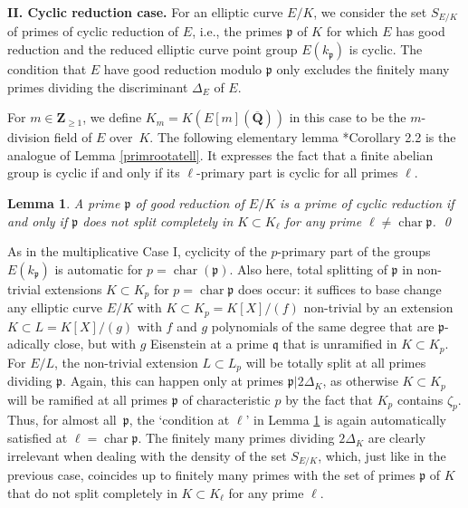\documentclass{amsart}
\theoremstyle{plain}
\newtheorem{lemma}[theorem]{Lemma}
\theoremstyle{definition}
\DeclareMathOperator{\characteristic}{char}
\newcommand{\Que}{{\mathbf{Q}}}
\newcommand{\Zee}{{\mathbf{Z}}}
\newcommand{\gothp}{{\mathfrak{p}}}
\newcommand{\gothq}{{\mathfrak{q}}}
\begin{document}
\medskip\noindent
{\bf II. Cyclic reduction case.}
For an elliptic curve $E/K$, we consider the set $S_{E/K}$ of 
primes of cyclic reduction of $E$, i.e.,
the primes $\gothp$ of $K$
for which $E$ has good reduction and the reduced elliptic
curve point group $E(k_\gothp)$ is cyclic.
The condition that $E$ have good reduction modulo $\gothp$ 
only excludes the finitely many primes dividing the
discriminant $\Delta_E$ of $E$.
 
For $m\in\Zee_{\ge1}$, we define $K_m=K(E[m](\overline \Que))$ 
in this case to be the $m$-division field of $E$ over~$K$.
The following elementary lemma \cite{Campagna-Stevenhagen}*{Corollary 2.2} 
is the analogue of Lemma \ref{primrootatell}. 
It expresses the fact that a finite abelian group is cyclic if and only if 
its $\ell$-primary part is cyclic for all primes $\ell$.

\begin{lemma}
\label{cyclicreductionatell}
A prime $\gothp$ of good reduction of $E/K$
is a prime of cyclic reduction
if and only if $\gothp$ does not split completely in 
$K\subset K_\ell$ for any prime 
$\ell\ne\characteristic{\gothp}$.
\qed
\end{lemma}
\noindent
As in the multiplicative Case I, cyclicity of the $p$-primary part of the groups $E(k_\gothp)$
is automatic for $p=\characteristic (\gothp)$.
Also here, total splitting of $\gothp$ in non-trivial extensions $K\subset K_p$ for 
$p=\characteristic{\gothp}$ does occur: it suffices to base change any elliptic curve $E/K$ with 
$K\subset K_p=K[X]/(f)$ non-trivial by an extension $K\subset L= K[X]/(g)$ with 
$f$ and $g$ polynomials of the same degree that are $\gothp$-adically close, 
but with $g$ Eisenstein at a prime $\gothq$ that is unramified in $K\subset K_p$.
For $E/L$, the non-trivial extension $L\subset L_p$ will be totally split at all primes dividing $\gothp$.
Again, this can happen only at primes $\gothp|2\Delta_K$, as otherwise $K\subset K_p$ will be
ramified at all primes $\gothp$ of characteristic $p$ by the fact that $K_p$ contains $\zeta_p$.
Thus, for almost all~$\gothp$,
the `condition at $\ell$' in Lemma \ref{cyclicreductionatell} is again 
automatically satisfied at $\ell=\characteristic{\gothp}$.
The finitely many primes dividing $2\Delta_K$ are clearly irrelevant when dealing with the density of the set $S_{E/K}$, which, just like in the previous case, coincides up to 
finitely many primes with the set of primes $\gothp$ of $K$ that do not 
split completely in $K\subset K_\ell$ for any prime $\ell$.
\end{document}
